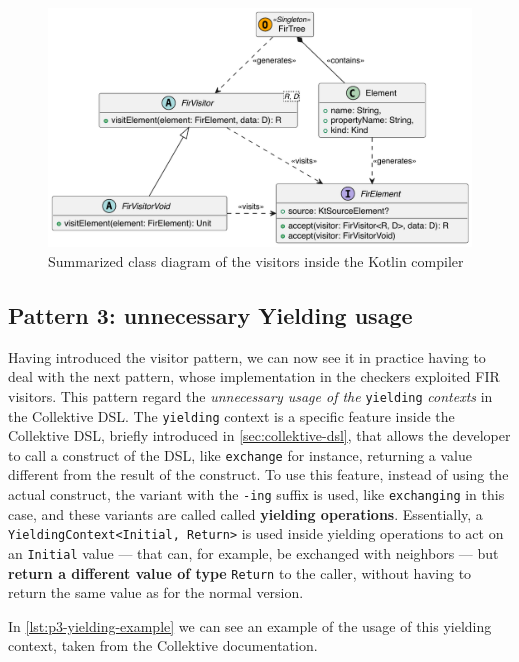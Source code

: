 \documentclass[12pt,a4paper,openright,twoside]{book}
\begin{document}
\begin{figure}
  \centering
  \includegraphics[width=.7\linewidth]{figures/fir-visitors.pdf}
  \caption{Summarized class diagram of the visitors inside the Kotlin 
  compiler}
  \label{fig:fir-visitors-class-diagram}
\end{figure}

\subsection{Pattern 3: unnecessary Yielding usage}

Having introduced the visitor pattern, we can now see it in practice having 
to deal with the next pattern, whose implementation in the checkers exploited
\ac{FIR} visitors. This pattern regard the \emph{unnecessary usage of the} 
\lstinline{yielding} \emph{contexts} in the Collektive DSL. 
%
The \lstinline{yielding} context is a specific feature inside the Collektive
\ac{DSL}, briefly introduced in \cref{sec:collektive-dsl}, that allows the
developer to call a construct of the \ac{DSL}, like \lstinline{exchange} for
instance, returning a value different from the result of the construct. To use
this feature, instead of using the actual construct, the variant with the
\lstinline{-ing} suffix is used, like \lstinline{exchanging} in this case, and
these variants are called called \textbf{yielding operations}. 
%
Essentially, a \lstinline{YieldingContext<Initial, Return>} is used inside
yielding operations to act on an \lstinline{Initial} value --- that can, for
example, be exchanged with neighbors --- but \textbf{return a different value of
type} \lstinline{Return} to the caller, without having to return the same value
as for the normal version.

In \cref{lst:p3-yielding-example} we can see an example of the usage of this
yielding context, taken from the Collektive documentation. 


\end{document}
